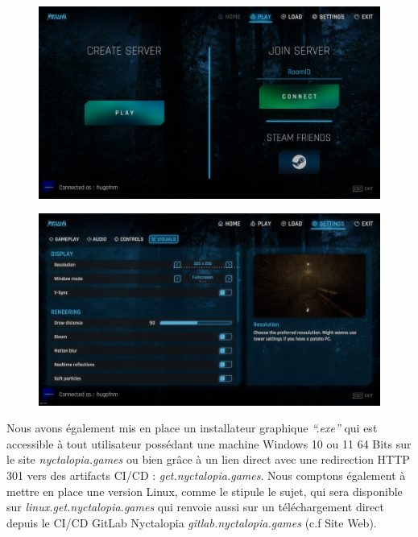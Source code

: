 \begin{figure}[H]
\centering
\begin{minipage}{.5\textwidth}
  \centering
  \includegraphics[width=.9\linewidth]{img/ui/UI.png}
  \label{fig:uiplay}
\end{minipage}%
\begin{minipage}{.5\textwidth}
  \centering
  \includegraphics[width=.9\linewidth]{img/ui/UI4.png}
  \label{fig:uisettings}
\end{minipage}
\end{figure}

Nous avons également mis en place un installateur graphique \emph{``.exe''} qui est accessible à tout utilisateur possédant une machine Windows 10 ou 11 64 Bits sur le site \emph{nyctalopia.games} ou bien grâce à un lien direct avec une redirection HTTP 301 vers des artifacts CI/CD : \emph{get.nyctalopia.games}.
Nous comptons également à mettre en place une version Linux, comme le stipule le sujet, qui sera disponible sur \emph{linux.get.nyctalopia.games} qui renvoie aussi sur un téléchargement direct depuis le CI/CD GitLab Nyctalopia \emph{gitlab.nyctalopia.games} (c.f Site Web).

